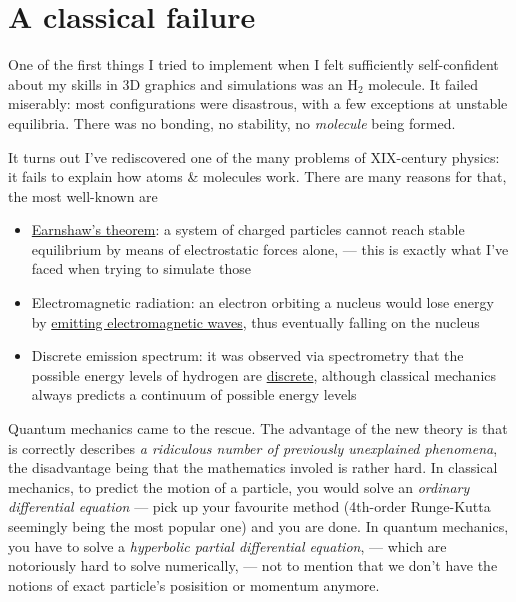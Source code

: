 \documentclass{article}
\newcommand{\molecule}[1]{\textrm{#1}}
\begin{document}
\section{A classical failure}

One of the first things I tried to implement when I felt sufficiently self-confident about my skills in 3D graphics and simulations was an \(\molecule{H}_2\) molecule. It failed miserably: most configurations were disastrous, with a few exceptions at unstable equilibria. There was no bonding, no stability, no \textit{molecule} being formed.

It turns out I've rediscovered one of the many problems of XIX-century physics: it fails to explain how atoms \& molecules work. There are many reasons for that, the most well-known are

\begin{itemize}
\item \href{https://en.wikipedia.org/wiki/Earnshaw's_theorem}{Earnshaw's theorem}: a system of charged particles cannot reach stable equilibrium by means of electrostatic forces alone, --- this is exactly what I've faced when trying to simulate those
\item Electromagnetic radiation: an electron orbiting a nucleus would lose energy by \href{https://en.wikipedia.org/wiki/Larmor_formula}{emitting electromagnetic waves}, thus eventually falling on the nucleus
\item Discrete emission spectrum: it was observed via spectrometry that the possible energy levels of hydrogen are \href{https://en.wikipedia.org/wiki/Hydrogen_spectral_series}{discrete}, although classical mechanics always predicts a continuum of possible energy levels
\end{itemize}

Quantum mechanics came to the rescue. The advantage of the new theory is that is correctly describes \textit{a ridiculous number of previously unexplained phenomena}, the disadvantage being that the mathematics involed is rather hard. In classical mechanics, to predict the motion of a particle, you would solve an \textit{ordinary differential equation} --- pick up your favourite method (4th-order Runge-Kutta seemingly being the most popular one) and you are done. In quantum mechanics, you have to solve a \textit{hyperbolic partial differential equation}, --- which are notoriously hard to solve numerically, --- not to mention that we don't have the notions of exact particle's posisition or momentum anymore.
\end{document}
